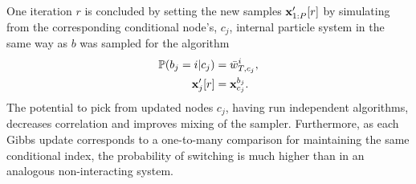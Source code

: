 %
One \mcmc iteration $r$ is concluded by setting the new samples $\mathbf{x}_{1:P}'[r]$ by simulating from the corresponding conditional node's, $c_j$, internal particle system in the same way as $b$ was sampled for the \pg algorithm
\begin{align}
\label{eq:simTrajectory}
\Prb(b_j = i | c_j) &= \nw_{T,c_j}^i, \nonumber\\%
\xb_j'[r] &= \xb_{c_j}^{b_j}.
\end{align}
The potential to pick from updated nodes $c_j$, having run independent \smc algorithms, decreases correlation and improves mixing of the  \mcmc sampler. Furthermore, as each Gibbs update corresponds to a one-to-many comparison for maintaining the same conditional index, the probability of switching is much higher than in an analogous non-interacting system.

